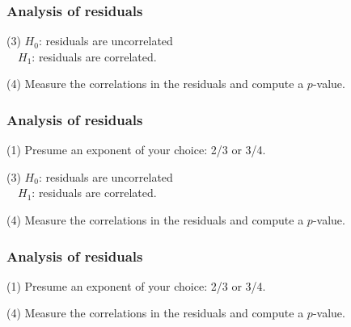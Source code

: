 \begin{frame}
  \frametitle{Analysis of residuals}


\inv



(3) $H_0$: residuals are uncorrelated\\
\ \ \quad $H_1$: residuals are correlated.

(4) Measure the correlations in the residuals
and compute a $p$-value.

\vis

\end{frame}

\begin{frame}
  \frametitle{Analysis of residuals}

(1) Presume an exponent of your choice: 2/3 or 3/4.



\inv

(3) $H_0$: residuals are uncorrelated\\
\ \ \quad $H_1$: residuals are correlated.

(4) Measure the correlations in the residuals
and compute a $p$-value.

\vis

\end{frame}

\begin{frame}
  \frametitle{Analysis of residuals}

(1) Presume an exponent of your choice: 2/3 or 3/4.




\inv

(4) Measure the correlations in the residuals
and compute a $p$-value.

\end{frame}

